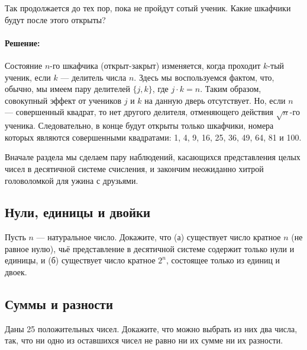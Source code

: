 Так продолжается до тех пор, пока не пройдут сотый ученик. 
Какие шкафчики будут после этого открыты?
                      
\paragraph{Решение:}


Состояние $n$-го шкафчика (открыт-закрыт) изменяется, когда проходит $k$-тый ученик, если $k$ --- делитель числа $n$.  
Здесь мы воспользуемся фактом, что, обычно,   мы имеем пару делителей $\{j,k\}$, где  $j\cdot k=n$. 
Таким образом, совокупный эффект от учеников  $j$ и $k$ на данную дверь отсутствует. %
Но, если $n$ ---  совершенный квадрат, то нет другого делителя, отменяющего действия  $\sqrt{n}$-го ученика. 
Следовательно, в конце будут открыты только шкафчики, номера которых являются совершенными квадратами:  1, 4, 9, 16, 25, 36, 49, 64, 81 и 100.\heart
                                                                                                                          
Вначале раздела мы сделаем пару наблюдений, касающихся представления целых чисел  в десятичной системе счисления, и закончим неожиданно хитрой головоломкой для ужина с друзьями. %




\subsection*{Нули, единицы и двойки}%


Пусть $n$ --- натуральное число.  
Докажите, что (а) существует число кратное $n$ (не равное нулю), чьё  представление в десятичной системе содержит только нули и единицы, и
(б) существует число кратное $2^n$, состоящее только из единиц и двоек.






\subsection*{Суммы и разности} %


Даны 25 положительных чисел. 
Докажите, что можно выбрать из них два числа, так, что ни одно из оставшихся чисел не равно ни их сумме ни их разности.




